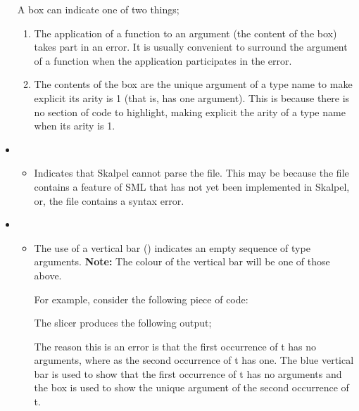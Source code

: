 \documentclass{report}
\begin{document}
\begin{itemize}
\subitem A box can indicate one of two things;

\begin{enumerate}
\item The application of a
  function to an argument (the content of the box) takes part in an
  error. It is usually convenient to surround the argument of a
  function when the application participates in the error.
\item The contents of the box are the unique argument of a type name
  to make explicit its arity is 1 (that is, has one argument). This is
  because there is no section of code to highlight, making explicit the
  arity of a type name when its arity is 1.
\end{enumerate}

\item {}

\begin{itemize}
\item Indicates that Skalpel cannot parse the file. This
  may be because the file contains a feature of SML that has not yet
  been implemented in Skalpel, or, the file contains a
  syntax error.
\end{itemize}

\item {}

\begin{itemize}
\item The use of a vertical bar (\incodebody{|}) indicates an empty sequence of type
  arguments. \textbf{Note:} The colour of the vertical bar will be one of those
  above.

  For example, consider the following piece of code:


  The slicer produces the following output;


  The reason this is an error is that the first occurrence of t has no
  arguments, where as the second occurrence of t has one. The blue
  vertical bar is used to show that the first occurrence of t has no arguments
  and the \tesEndPointOne box is used to show the unique argument of the second
  occurrence of t.
\end{itemize}

\end{itemize}
\end{document}
